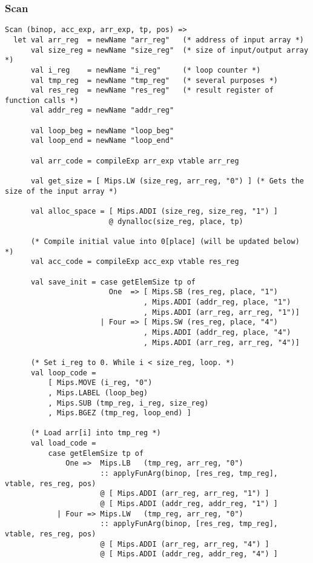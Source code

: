 \documentclass[12pt]{article}
\begin{document}
\subsubsection{Scan}
\begin{verbatim}
Scan (binop, acc_exp, arr_exp, tp, pos) =>
  let val arr_reg  = newName "arr_reg"   (* address of input array *)
      val size_reg = newName "size_reg"  (* size of input/output array *)
      val i_reg    = newName "i_reg"     (* loop counter *)
      val tmp_reg  = newName "tmp_reg"   (* several purposes *)
      val res_reg  = newName "res_reg"   (* result register of function calls *)
      val addr_reg = newName "addr_reg"

      val loop_beg = newName "loop_beg"
      val loop_end = newName "loop_end"

      val arr_code = compileExp arr_exp vtable arr_reg

      val get_size = [ Mips.LW (size_reg, arr_reg, "0") ] (* Gets the size of the input array *)

      val alloc_space = [ Mips.ADDI (size_reg, size_reg, "1") ]
                        @ dynalloc(size_reg, place, tp)

      (* Compile initial value into 0[place] (will be updated below) *)
      val acc_code = compileExp acc_exp vtable res_reg 

      val save_init = case getElemSize tp of
                        One  => [ Mips.SB (res_reg, place, "1")
                                , Mips.ADDI (addr_reg, place, "1")
                                , Mips.ADDI (arr_reg, arr_reg, "1")]
                      | Four => [ Mips.SW (res_reg, place, "4")
                                , Mips.ADDI (addr_reg, place, "4")
                                , Mips.ADDI (arr_reg, arr_reg, "4")]

      (* Set i_reg to 0. While i < size_reg, loop. *)
      val loop_code =
          [ Mips.MOVE (i_reg, "0")
          , Mips.LABEL (loop_beg)
          , Mips.SUB (tmp_reg, i_reg, size_reg)
          , Mips.BGEZ (tmp_reg, loop_end) ]

      (* Load arr[i] into tmp_reg *)
      val load_code =
          case getElemSize tp of
              One =>  Mips.LB   (tmp_reg, arr_reg, "0")
                      :: applyFunArg(binop, [res_reg, tmp_reg], vtable, res_reg, pos)
                      @ [ Mips.ADDI (arr_reg, arr_reg, "1") ]
                      @ [ Mips.ADDI (addr_reg, addr_reg, "1") ]
            | Four => Mips.LW   (tmp_reg, arr_reg, "0")
                      :: applyFunArg(binop, [res_reg, tmp_reg], vtable, res_reg, pos)
                      @ [ Mips.ADDI (arr_reg, arr_reg, "4") ]
                      @ [ Mips.ADDI (addr_reg, addr_reg, "4") ]


\end{verbatim}
\end{document}
